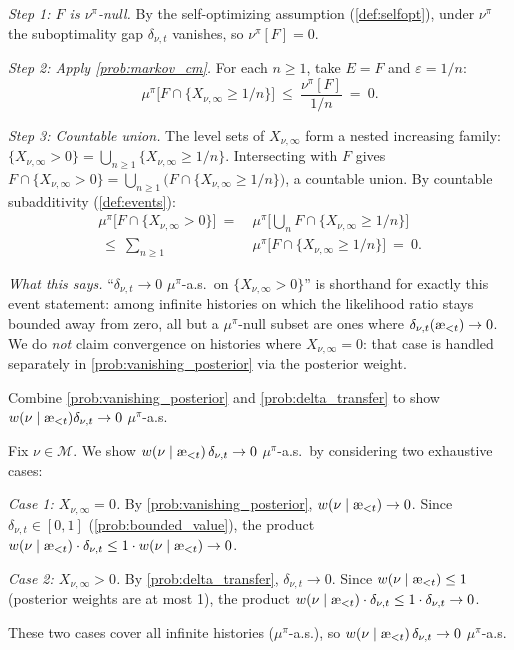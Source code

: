 \documentclass[fontsize=11pt, parskip=half]{scrartcl}
\newcommand{\cM}{\mathcal{M}}
\newcommand{\aes}{\textnormal{\ae}}
\begin{document}
\begin{solution}
\emph{Step 1: $F$ is $\nu^\pi$-null.} By the self-optimizing assumption (\cref{def:selfopt}), under $\nu^\pi$ the suboptimality gap $\delta_{\nu,t}$ vanishes, so $\nu^\pi[F] = 0$.

\emph{Step 2: Apply \cref{prob:markov_cm}.} For each $n \geq 1$, take $E = F$ and $\varepsilon = 1/n$:
\[
    \mu^\pi\!\big[F \cap \{X_{\nu,\infty} \geq 1/n\}\big]
    ~\leq~ \frac{\nu^\pi[F]}{1/n}
    ~=~ 0.
\]

\emph{Step 3: Countable union.} The level sets of $X_{\nu,\infty}$ form a nested increasing family: $\{X_{\nu,\infty} > 0\} = \bigcup_{n \geq 1} \{X_{\nu,\infty} \geq 1/n\}$. Intersecting with $F$ gives $F \cap \{X_{\nu,\infty} > 0\} = \bigcup_{n \geq 1} \big(F \cap \{X_{\nu,\infty} \geq 1/n\}\big)$, a countable union. By countable subadditivity (\cref{def:events}):
\begin{align*}
    \mu^\pi\!\big[F \cap \{X_{\nu,\infty} > 0\}\big]
    ~=~ &\mu^\pi\!\Big[\textstyle\bigcup_{n} F \cap \{X_{\nu,\infty} \geq 1/n\}\Big] \\
    ~\leq~ \sum_{n \geq 1} \, &\mu^\pi\!\big[F \cap \{X_{\nu,\infty} \geq 1/n\}\big]
    ~=~ 0.
\end{align*}

\emph{What this says.} ``$\delta_{\nu,t} \to 0$ $\mu^\pi$-a.s.\ on $\{X_{\nu,\infty} > 0\}$'' is shorthand for exactly this event statement: among infinite histories on which the likelihood ratio stays bounded away from zero, all but a $\mu^\pi$-null subset are ones where $\delta_{\nu,t}(\aes_{<t}) \to 0$. We do \emph{not} claim convergence on histories where $X_{\nu,\infty} = 0$: that case is handled separately in \cref{prob:vanishing_posterior} via the posterior weight.
\end{solution}

\begin{exercise}
\label{prob:single_term}
Combine \cref{prob:vanishing_posterior} and \cref{prob:delta_transfer} to show $w(\nu \mid \aes_{<t}) \delta_{\nu,t} \to 0$ $\mu^\pi$-a.s.

\end{exercise}

\begin{solution}
Fix $\nu \in \cM$. We show $w(\nu \mid \aes_{<t})\, \delta_{\nu,t} \to 0$ $\mu^\pi$-a.s.\ by considering two exhaustive cases:

\emph{Case 1: $X_{\nu,\infty} = 0$.}
By \cref{prob:vanishing_posterior}, $w(\nu \mid \aes_{<t}) \to 0$. Since $\delta_{\nu,t} \in [0,1]$ (\cref{prob:bounded_value}), the product $w(\nu \mid \aes_{<t}) \cdot \delta_{\nu,t} \leq 1 \cdot w(\nu \mid \aes_{<t}) \to 0$.

\emph{Case 2: $X_{\nu,\infty} > 0$.}
By \cref{prob:delta_transfer}, $\delta_{\nu,t} \to 0$. Since $w(\nu \mid \aes_{<t}) \leq 1$ (posterior weights are at most 1), the product $w(\nu \mid \aes_{<t}) \cdot \delta_{\nu,t} \leq 1 \cdot \delta_{\nu,t} \to 0$.

These two cases cover all infinite histories ($\mu^\pi$-a.s.), so $w(\nu \mid \aes_{<t})\, \delta_{\nu,t} \to 0$ $\mu^\pi$-a.s.
\end{solution}
\end{document}
